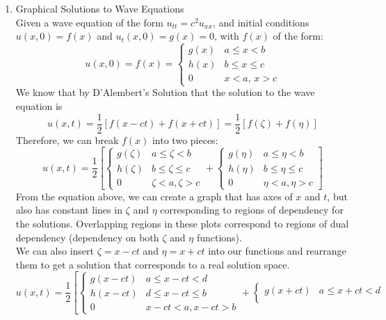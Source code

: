 \documentclass{article}
\begin{document}
\begin{enumerate}
    \item Graphical Solutions to Wave Equations
    \medskip\\
    Given a wave equation of the form $u_{tt} = c^2u_{xx}$, and initial conditions $u(x,0)=f(x)$ and $u_t(x,0) = g(x) = 0$, with $f(x)$ of the form:
    \[
        u(x,0) = f(x) = 
        \begin{cases}
            g(x) & a \leq x < b\\
            h(x) & b \leq x \leq c\\
            0 & x < a,\, x > c
        \end{cases}
    \]
    We know that by D'Alembert's Solution that the solution to the wave equation is
    \[
        u(x,t) = \frac{1}{2}\left[f(x-ct) + f(x+ct)\right] = \frac{1}{2}\left[f(\zeta) + f(\eta)\right]
    \]
    Therefore, we can break $f(x)$ into two pieces:
    \[
        u(x,t) = \frac{1}{2}\left[
        \begin{cases}
            g(\zeta) & a \leq \zeta < b\\
            h(\zeta) & b \leq \zeta \leq c\\
            0 & \zeta < a, \zeta > c
        \end{cases}
        +
        \begin{cases}
            g(\eta) & a \leq \eta < b \\
            h(\eta) & b \leq \eta \leq c \\
            0 & \eta < a, \eta > c
        \end{cases}
        \right]
    \]
    From the equation above, we can create a graph that has axes of $x$ and $t$, but also has constant lines in $\zeta$ and $\eta$ corresponding to regions of dependency for the solutions. Overlapping regions in these plots correspond to regions of dual dependency (dependency on both $\zeta$ and $\eta$ functions).
    \bigskip\\
    We can also insert $\zeta = x-ct$ and $\eta = x+ct$ into our functions and rearrange them to get a solution that corresponds to a real solution space.
    \[
        u(x,t) = \frac{1}{2}\left[
        \begin{cases}
            g(x-ct) & a \leq x-ct < d\\
            h(x-ct) & d \leq x-ct \leq b\\
            0 & x-ct < a, x-ct > b
        \end{cases}
        +
        \begin{cases}
            g(x+ct) & a \leq x+ct < d \\

\end{cases}\]
\end{enumerate}
\end{document}
